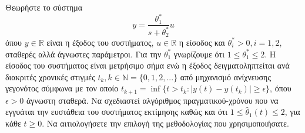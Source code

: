 \documentclass[a4paper,11pt]{article}
\begin{document}
\begin{question}
Θεωρήστε το σύστημα
\begin{equation}
    y = \frac{\theta_1^*}{s + \theta_2^*} u
\end{equation}
όπου $y \in \mathbb{R}$ είναι η έξοδος του συστήματος, $u \in \mathbb{R}$ η είσοδος και $\theta_i^* > 0, i = 1, 2$, σταθερές αλλά άγνωστες παράμετροι. Για την $\theta_1^*$ γνωρίζουμε ότι $1 \le \theta_1^* \le 2$. Η είσοδος του συστήματος είναι μετρήσιμο σήμα ενώ η έξοδος δειγματοληπτείται ανά διακριτές χρονικές στιγμές $t_k, k \in \mathbb{N} = \{0, 1, 2, ...\}$ από μηχανισμό ανίχνευσης γεγονότος σύμφωνα με τον οποίο $t_{k+1} = \inf\{t > t_k : |y(t) - y(t_k)| \ge \epsilon\}$, όπου $\epsilon > 0$ άγνωστη σταθερά. Να σχεδιαστεί αλγόριθμος πραγματικού-χρόνου που να εγγυάται την ευστάθεια του συστήματος εκτίμησης καθώς και ότι $1 \le \hat{\theta}_1(t) \le 2$, για κάθε $t \ge 0$. Να αιτιολογήσετε την επιλογή της μεθοδολογίας που χρησιμοποιήσατε.
\end{question}
\end{document}
